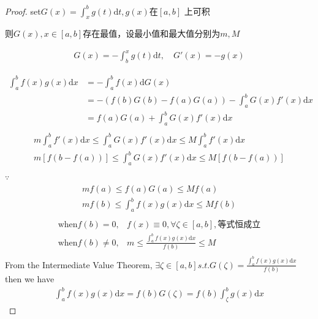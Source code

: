 \documentclass[10pt,a4paper]{book}
\begin{document}
\begin{proof}
	set$ G(x) = \int_{x}^{b}g(t)\text{d}t , g(x)\text{在}[a,b] $	上可积

	则$ G(x),x\in [a,b] $存在最值，设最小值和最大值分别为$ m,M $
	
	\begin{gather}
		G(x) = -\int_{b}^{x}g(t)\text{d}t,\quad  G'(x) = -g(x)
	\end{gather}

\begin{equation}
	\begin{aligned}
		\int_{a}^{b}f(x)g(x)\text{d}x &= -\int_{a}^{b}f(x)\text{d}G(x)\\
		&=-{(f(b)G(b) - f(a)G(a)) -\int_{a}^{b}G(x)f'(x)\text{d}x }\\
		&= f(a)G(a)+ \int_{a}^{b}G(x)f'(x)\text{d}x\\
	\end{aligned}
\end{equation}
	\begin{gather}
		m\int_{a}^{b}f'(x)\text{d}x \le \int_{a}^{b} G(x)f'(x)\text{d}x \le M\int_{a}^{b}f'(x)\text{d}x\\
		m[f(b-f(a))] \le  \int_{a}^{b} G(x)f'(x)\text{d}x \le M[f(b-f(a))]\\
	\end{gather}
$ \because $
	\begin{gather}
		mf(a) \le  f(a)G(a) \le Mf(a)\\	
		mf(b) \le  \int_{a}^{b} f(x)g(x) \text{d}x \le Mf(b)\\	
	\end{gather}
\begin{equation}
	\begin{gather}
		\text{when} f(b)=0,    &f(x)\equiv 0, \forall \zeta \in [a,b], \text{等式恒成立}\\
		\text{when} f(b)\neq0, &m\le \frac{\int_{a}^{b}f(x)g(x)\text{d}x}{f(b)}\le M\\
	\end{gather}
\end{equation}
	From the Intermediate Value Theorem, $ \exists \zeta \in [a,b] s.t. G(\zeta) = \frac{\int_{a}^{b}f(x)g(x)\text{d}x}{f(b)} $\\
	then we have
	\begin{gather}
		\int_{a}^{b}f(x)g(x)\text{d}x = f(b)G(\zeta) = f(b)\int_{\zeta}^{b}g(x)\text{d}x
	\end{gather}
	
	
\end{proof}
\end{document}
